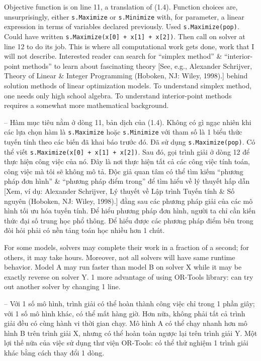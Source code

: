 \documentclass{article}
\begin{document}
\begin{itemize}
\begin{itemize}
        Objective function is on line 11, a translation of (1.4). Function choices are, unsurprisingly, either {\tt s.Maximize} or {\tt s.Minimize} with, for parameter, a linear expression in terms of variables declared previously. Used {\tt s.Maximize(pop)}. Could have written {\tt s.Maximize(x[0] + x[1] + x[2])}. Then call on solver at line 12 to do its job. This is where all computational work gets done, work that I will not describe. Interested reader can search for ``simplex method'' \& ``interior-point methods'' to learn about fascinating theory [See, e.g., {\sc Alexander Schrijver}, Theory of Linear \& Integer Programming (Hoboken, NJ: Wiley, 1998).] behind solution methods of linear optimization models. To understand simplex method, one needs only high school algebra. To understand interior-point methods requires a somewhat more mathematical background.

        -- Hàm mục tiêu nằm ở dòng 11, bản dịch của (1.4). Không có gì ngạc nhiên khi các lựa chọn hàm là {\tt s.Maximize} hoặc {\tt s.Minimize} với tham số là 1 biểu thức tuyến tính theo các biến đã khai báo trước đó. Đã sử dụng {\tt s.Maximize(pop)}. Có thể viết {\tt s.Maximize(x[0] + x[1] + x[2])}. Sau đó, gọi trình giải ở dòng 12 để thực hiện công việc của nó. Đây là nơi thực hiện tất cả các công việc tính toán, công việc mà tôi sẽ không mô tả. Độc giả quan tâm có thể tìm kiếm ``phương pháp đơn hình'' \& ``phương pháp điểm trong'' để tìm hiểu về lý thuyết hấp dẫn [Xem, ví dụ: {\sc Alexander Schrijver}, Lý thuyết về Lập trình Tuyến tính \& Số nguyên (Hoboken, NJ: Wiley, 1998).] đằng sau các phương pháp giải của các mô hình tối ưu hóa tuyến tính. Để hiểu phương pháp đơn hình, người ta chỉ cần kiến thức đại số trung học phổ thông. Để hiểu được các phương pháp điểm bên trong đòi hỏi phải có nền tảng toán học nhiều hơn 1 chút.

        For some models, solvers may complete their work in a fraction of a second; for others, it may take hours. Moreover, not all solvers will have same runtime behavior. Model A may run faster than model B on solver X while it may be exactly reverse on solver Y. 1 more advantage of using OR-Tools library: can try out another solver by changing 1 line.

        -- Với 1 số mô hình, trình giải có thể hoàn thành công việc chỉ trong 1 phần giây; với 1 số mô hình khác, có thể mất hàng giờ. Hơn nữa, không phải tất cả trình giải đều có cùng hành vi thời gian chạy. Mô hình A có thể chạy nhanh hơn mô hình B trên trình giải X, nhưng có thể hoàn toàn ngược lại trên trình giải Y. Một lợi thế nữa của việc sử dụng thư viện OR-Tools: có thể thử nghiệm 1 trình giải khác bằng cách thay đổi 1 dòng.


\end{itemize}
\end{itemize}
\end{document}

